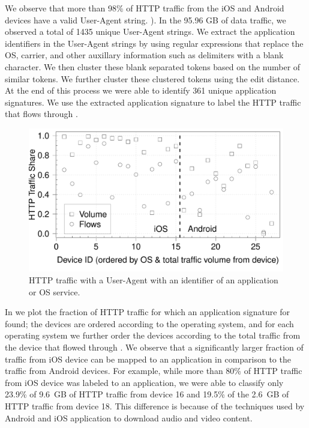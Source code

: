 We observe that more than 98\% of HTTP traffic from the iOS and Android devices have a valid User-Agent string. ).
In the 95.96 GB of data traffic, we observed a total of 1435 unique User-Agent strings.
We extract the application identifiers in the User-Agent strings by using regular expressions that replace the OS, carrier, and other auxillary information such as delimiters with a blank character.
We then cluster these blank separated tokens based on the number of similar tokens.
We further cluster these clustered tokens using the edit distance. 
At the end of this process we were able to identify 361 unique application signatures.
We use the extracted application signature to label the HTTP traffic that flows through \platname.

\begin{figure}
\includegraphics[width=\columnwidth]{plots/appusage_someappsig_traffic.pdf}
\caption{HTTP traffic with a User-Agent with an identifier of an application or OS service.}
\label{fig:http-classification-app-user-agent}
\end{figure}

In  we plot the fraction of HTTP traffic for which an application signature for found; the devices are ordered according to the operating system, and for each operating system we further order the devices according to the total traffic from the device that flowed through \platname. 
We observe that a significantly larger fraction of traffic from iOS device can be mapped to an application in comparison to the traffic from Android devices. 
For example, while more than 80\% of HTTP traffic from iOS device was labeled to an application, we were able to classify only 23.9\% of 9.6~GB of HTTP traffic from device 16 and 19.5\% of the 2.6~GB of HTTP traffic from device 18.
This difference is because of the techniques used by Android and iOS application to download audio and video content. 

